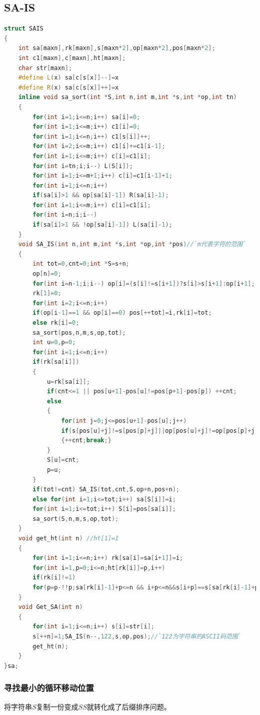 \documentclass[a4paper]{book}
\begin{document}
\subsection{SA-IS}
\begin{lstlisting}[language=c++,escapeinside=``]
struct SAIS
{
    int sa[maxn],rk[maxn],s[maxn*2],op[maxn*2],pos[maxn*2];
    int c1[maxn],c[maxn],ht[maxn];
    char str[maxn];
    #define L(x) sa[c[s[x]]--]=x
    #define R(x) sa[c[s[x]]++]=x
    inline void sa_sort(int *S,int n,int m,int *s,int *op,int tn)
    {
        for(int i=1;i<=n;i++) sa[i]=0;
        for(int i=1;i<=m;i++) c1[i]=0;
        for(int i=1;i<=n;i++) c1[s[i]]++;
        for(int i=2;i<=m;i++) c1[i]+=c1[i-1];
        for(int i=1;i<=m;i++) c[i]=c1[i];
        for(int i=tn;i;i--) L(S[i]);
        for(int i=1;i<=m+1;i++) c[i]=c1[i-1]+1;
        for(int i=1;i<=n;i++)
        if(sa[i]>1 && op[sa[i]-1]) R(sa[i]-1);
        for(int i=1;i<=m;i++) c[i]=c1[i];
        for(int i=n;i;i--)
        if(sa[i]>1 && !op[sa[i]-1]) L(sa[i]-1);
    }
    void SA_IS(int n,int m,int *s,int *op,int *pos)//`m代表字符的范围`
    {
        int tot=0,cnt=0;int *S=s+n;
        op[n]=0;
        for(int i=n-1;i;i--) op[i]=(s[i]!=s[i+1])?s[i]>s[i+1]:op[i+1];
        rk[1]=0;
        for(int i=2;i<=n;i++)
        if(op[i-1]==1 && op[i]==0) pos[++tot]=i,rk[i]=tot;
        else rk[i]=0;
        sa_sort(pos,n,m,s,op,tot);
        int u=0,p=0;
        for(int i=1;i<=n;i++)
        if(rk[sa[i]])
        {
            u=rk[sa[i]];
            if(cnt<=1 || pos[u+1]-pos[u]!=pos[p+1]-pos[p]) ++cnt;
            else
            {
                for(int j=0;j<=pos[u+1]-pos[u];j++)
                if(s[pos[u]+j]!=s[pos[p]+j]||op[pos[u]+j]!=op[pos[p]+j])
                {++cnt;break;}
            }
            S[u]=cnt;
            p=u;
        }
        if(tot!=cnt) SA_IS(tot,cnt,S,op+n,pos+n);
        else for(int i=1;i<=tot;i++) sa[S[i]]=i;
        for(int i=1;i<=tot;i++) S[i]=pos[sa[i]];
        sa_sort(S,n,m,s,op,tot);
    }
    void get_ht(int n) //ht[1]=1
    {
        for(int i=1;i<=n;i++) rk[sa[i]=sa[i+1]]=i;
        for(int i=1,p=0;i<=n;ht[rk[i]]=p,i++)
        if(rk[i]!=1) 
        for(p=p-!!p;sa[rk[i]-1]+p<=n && i+p<=n&&s[i+p]==s[sa[rk[i]-1]+p];p++);
    }
    void Get_SA(int n)
    {
        for(int i=1;i<=n;i++) s[i]=str[i];
        s[++n]=1;SA_IS(n--,122,s,op,pos);//`122为字符串的ASCII码范围`
        get_ht(n);
    }
}sa;
\end{lstlisting}
\subsubsection{寻找最小的循环移动位置}
将字符串$S$复制一份变成$SS$就转化成了后缀排序问题。
\end{document}
